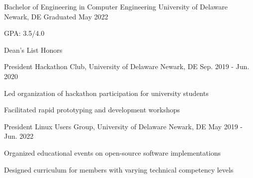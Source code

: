 \documentclass[11pt, a4paper]{awesome-cv}
\begin{document}

\begin{cventries}

  \cventry
    {Bachelor of Engineering in Computer Engineering}
    {University of Delaware}
    {Newark, DE}
    {Graduated May 2022}
    {
      \begin{cvitems}
        \item {GPA: 3.5/4.0}
        \item {Dean's List Honors}
      \end{cvitems}
    }

\end{cventries}


\begin{cventries}

  \cventry
    {President}
    {Hackathon Club, University of Delaware}
    {Newark, DE}
    {Sep. 2019 - Jun. 2020}
    {
      \begin{cvitems}
        \item {Led organization of hackathon participation for university students}
        \item {Facilitated rapid prototyping and development workshops}
      \end{cvitems}
    }

  \cventry
    {President}
    {Linux Users Group, University of Delaware}
    {Newark, DE}
    {May 2019 - Jun. 2022}
    {
      \begin{cvitems}
        \item {Organized educational events on open-source software implementations}
        \item {Designed curriculum for members with varying technical competency levels}
      \end{cvitems}
    }

\end{cventries}
\end{document}

